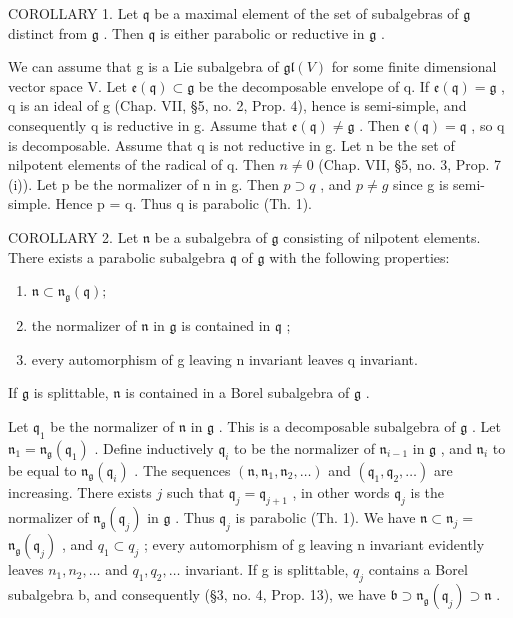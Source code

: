 COROLLARY 1. Let \(\mathfrak{q}\) be a maximal element of the set of subalgebras of \(\mathfrak{g}\) distinct from \(\mathfrak{g}\) . Then \(\mathfrak{q}\) is either parabolic or reductive in \(\mathfrak{g}\) .

We can assume that g is a Lie subalgebra of \(\mathfrak{gl}(V)\) for some finite dimensional vector space V. Let \(\mathfrak{e}(\mathfrak{q}) \subset \mathfrak{g}\) be the decomposable envelope of q. If \(\mathfrak{e}(\mathfrak{q}) = \mathfrak{g}\) , q is an ideal of g (Chap. VII, §5, no. 2, Prop. 4), hence is semi-simple, and consequently q is reductive in g. Assume that \(\mathfrak{e}(\mathfrak{q}) \neq \mathfrak{g}\) . Then \(\mathfrak{e}(\mathfrak{q}) = \mathfrak{q}\) , so q is decomposable. Assume that q is not reductive in g. Let n be the set of nilpotent elements of the radical of q. Then \(n \neq 0\) (Chap. VII, §5, no. 3, Prop. 7 (i)). Let p be the normalizer of n in g. Then \(p \supset q\) , and \(p \neq g\) since g is semi-simple. Hence p = q. Thus q is parabolic (Th. 1).

COROLLARY 2. Let \(\mathfrak{n}\) be a subalgebra of \(\mathfrak{g}\) consisting of nilpotent elements. There exists a parabolic subalgebra \(\mathfrak{q}\) of \(\mathfrak{g}\) with the following properties:

\begin{enumerate}
\def\labelenumi{(\roman{enumi})}
\item
  \(\mathfrak{n}\subset \mathfrak{n}_{\mathfrak{g}}(\mathfrak{q});\)
\item
  the normalizer of \(\mathfrak{n}\) in \(\mathfrak{g}\) is contained in \(\mathfrak{q}\) ;
\item
  every automorphism of g leaving n invariant leaves q invariant.
\end{enumerate}

If \(\mathfrak{g}\) is splittable, \(\mathfrak{n}\) is contained in a Borel subalgebra of \(\mathfrak{g}\) .

Let \(\mathfrak{q}_1\) be the normalizer of \(\mathfrak{n}\) in \(\mathfrak{g}\) . This is a decomposable subalgebra of \(\mathfrak{g}\) . Let \(\mathfrak{n}_1 = \mathfrak{n}_{\mathfrak{g}}(\mathfrak{q}_1)\) . Define inductively \(\mathfrak{q}_i\) to be the normalizer of \(\mathfrak{n}_{i-1}\) in \(\mathfrak{g}\) , and \(\mathfrak{n}_i\) to be equal to \(\mathfrak{n}_{\mathfrak{g}}(\mathfrak{q}_i)\) . The sequences \((\mathfrak{n}, \mathfrak{n}_1, \mathfrak{n}_2, \ldots)\) and \((\mathfrak{q}_1, \mathfrak{q}_2, \ldots)\) are increasing. There exists \(j\) such that \(\mathfrak{q}_j = \mathfrak{q}_{j+1}\) , in other words \(\mathfrak{q}_j\) is the normalizer of \(\mathfrak{n}_{\mathfrak{g}}(\mathfrak{q}_j)\) in \(\mathfrak{g}\) . Thus \(\mathfrak{q}_j\) is parabolic (Th. 1). We have \(\mathfrak{n} \subset \mathfrak{n}_j =\) \(\mathfrak{n}_{\mathfrak{g}}(\mathfrak{q}_{j})\) , and \(q_{1} \subset q_{j}\) ; every automorphism of g leaving n invariant evidently leaves \(n_{1}, n_{2}, \ldots\) and \(q_{1}, q_{2}, \ldots\) invariant. If g is splittable, \(q_{j}\) contains a Borel subalgebra b, and consequently (§3, no. 4, Prop. 13), we have \(\mathfrak{b} \supset \mathfrak{n}_{\mathfrak{g}}(\mathfrak{q}_{j}) \supset \mathfrak{n}\) .

